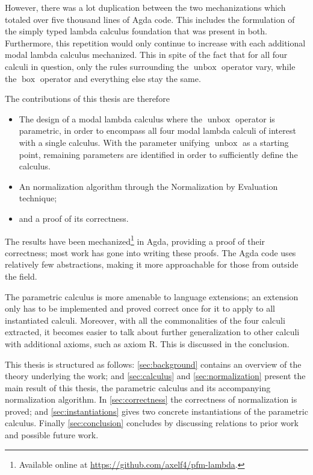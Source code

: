 \documentclass[12pt,twoside,openright]{report}
\numberwithin{equation}{chapter}
\numberwithin{figure}{chapter}
\numberwithin{table}{chapter}
\theoremstyle{definition}\newtheorem{definition}{Definition}
\begin{document}
However, there was a lot duplication between the two mechanizations
which totaled over five thousand lines of Agda code.
This includes the formulation of the simply typed lambda calculus foundation
that was present in both.
Furthermore, this repetition would only continue to increase
with each additional modal lambda calculus mechanized.
This in spite of the fact that for all four calculi in question,
only the rules surrounding the $\operatorname{unbox}$ operator vary,
while the $\operatorname{box}$ operator and everything else stay the same.

The contributions of this thesis are therefore
\begin{itemize}
\item The design of a modal lambda calculus
  where the $\operatorname{unbox}$ operator is parametric,
  in order to encompass all four modal lambda calculi of interest
  with a single calculus.
  With the parameter unifying $\operatorname{unbox}$ as a starting point,
  remaining parameters are identified in order to sufficiently define the calculus.
\item An normalization algorithm
  through the Normalization by Evaluation \cite{berger91} technique;
\item and a proof of its correctness.
\end{itemize}
The results have been mechanized\footnote{Available online at
\url{https://github.com/axelf4/pfm-lambda}.}
in Agda, providing a proof of their correctness;
most work has gone into writing these proofs.
The Agda code uses relatively few abstractions,
making it more approachable for those from outside the field.

The parametric calculus is more amenable to language extensions;
an extension only has to be implemented and proved correct once
for it to apply to all instantiated calculi.
Moreover, with all the commonalities of the four calculi extracted,
it becomes easier to talk about further generalization
to other calculi with additional axioms, such as axiom R.
This is discussed in the conclusion.

This thesis is structured as follows:
\autoref{sec:background} contains an overview of the theory underlying the work;
and \autoref{sec:calculus} and \autoref{sec:normalization}
present the main result of this thesis,
the parametric calculus and its accompanying normalization algorithm.
In \autoref{sec:correctness} the correctness of normalization is proved;
and \autoref{sec:instantiations} gives two concrete instantiations
of the parametric calculus.
Finally \autoref{sec:conclusion} concludes by discussing
relations to prior work and possible future work.
\end{document}
